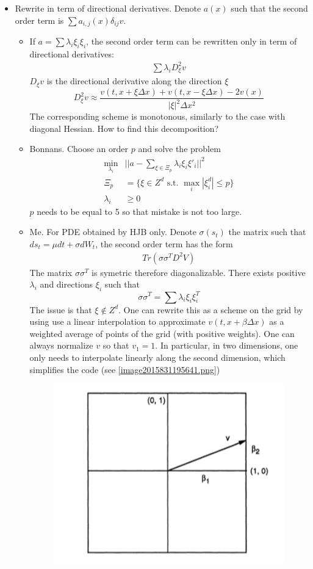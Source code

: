 \documentclass[english]{article}
\begin{document}
\begin{itemize}
\begin{itemize}
\begin{itemize}
		\end{itemize}
		\item Rewrite in term of directional derivatives. Denote $a(x)$ such that the second order term is $\sum a_{i, j}(x) \delta_{ij} v$.
		\begin{itemize}
			\item If  $a = \sum \lambda_i \xi_i \xi_i$, the second order term can be rewritten only in term of directional derivatives:
			\begin{align*}
				\sum \lambda_i D_\xi^2v
			\end{align*}
			$D_\xi v$ is the directional derivative along the direction $\xi$
			$$D^2_\xi v \approx \frac{v(t, x+\xi \Delta x) + v(t, x-\xi \Delta x) - 2 v(x)}{|\xi|^2 \Delta x^2}$$
			The corresponding scheme is monotonous, similarly to the case with diagonal Hessian. 
			How to find this decomposition?
			\item 
			Bonnans. Choose an order $p$ and solve the problem 
			\begin{align*}
				\min_{\lambda_i}&||a - \sum_{\xi \in \Xi_p} \lambda_i \xi_i \xi'_i||^2\\
				\Xi_p &= \{\xi \in Z^d \text{ s.t. }  \max_i|\xi_i^d| \leq p \}\\
				\lambda_i &\geq 0
			\end{align*}
			$p$ needs to be equal to 5 so that mistake is not too large.
			\item Me. For PDE obtained by HJB only. Denote $\sigma(s_t)$ the matrix such that $ds_t = \mu dt + \sigma dW_t$, the second order term has the form 
			\begin{align*}
				Tr(\sigma\sigma^TD^2V)
			\end{align*}
			The matrix $\sigma\sigma^T$ is symetric therefore diagonalizable. There exists positive $\lambda_i$ and directions $\xi_i$ such that
			$$\sigma\sigma^T = \sum \lambda_i \xi_i \xi_i^T$$ 
			The issue is that $\xi \notin Z^d$. One can rewrite this as a scheme on the grid by using use a linear interpolation to approximate $v(t, x+\beta \Delta x) $ as a weighted average of points of the grid (with positive weights). 
			One can always normalize $v$ so that $v_1 = 1$. In particular, in two dimensions, one only needs to interpolate linearly along the second dimension, which simplifies the code (see \autoref{image2015831195641.png})
			\begin{figure}[htp]
				\centering
				\includegraphics[width=4in]{image2015831195641.png}

\end{figure}
\end{itemize}
\end{itemize}
\end{itemize}
\end{document}
